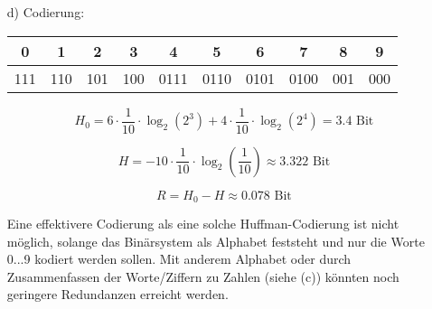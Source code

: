 \documentclass[a4paper,10pt]{scrartcl}
\begin{document}
\begin{enumerate}
\begin{enumerate}
            \item[d)]
            	Codierung:

                \begin{tabular}{c|c|c|c|c|c|c|c|c|c}
                    0 & 1 & 2 & 3 & 4 & 5 & 6 & 7 & 8 & 9 \\
                    \hline
                    111 & 110 & 101 & 100 & 0111 & 0110 & 0101 & 0100 & 001 & 000
                \end{tabular}

                $$H_0 = 6 \cdot \frac{1}{10} \cdot \log_2(2^3) + 4 \cdot \frac{1}{10} \cdot \log_2(2^4) = 3.4 \text{ Bit}$$

                $$H = - 10 \cdot \frac{1}{10} \cdot \log_2(\frac{1}{10}) \approx 3.322 \text{ Bit}$$

                $$R = H_0 - H \approx 0.078 \text{ Bit}$$

                Eine effektivere Codierung als eine solche Huffman-Codierung ist nicht möglich, solange das Binärsystem
                als Alphabet feststeht und nur die Worte 0...9 kodiert werden sollen. Mit anderem Alphabet oder durch
                Zusammenfassen der Worte/Ziffern zu Zahlen (siehe (c)) könnten noch geringere Redundanzen erreicht werden.

        \end{enumerate}
\end{enumerate}
\end{document}
